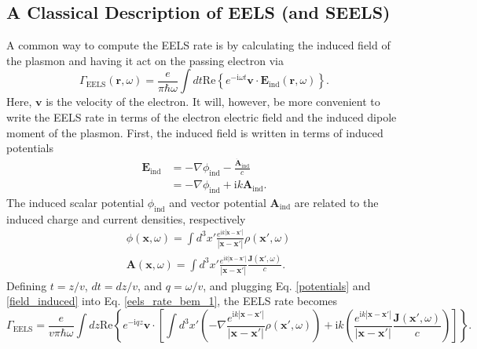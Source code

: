 \documentclass [11pt, proquest] {uwthesis}[2016/11/22]
\begin{document}
\subsection{A Classical Description of EELS (and SEELS)}

A common way to compute the EELS rate is by calculating the induced field of the plasmon and having it act on the passing electron via \cite{AbajoRevMod,Hohenester2014,Quillin}
\begin{equation}
\Gamma_{\textrm{EELS}}(\textbf{r},\omega) = \frac{e}{\pi\hbar\omega}\int dt \textrm{Re}\left\{ e^{-\textrm{i}\omega t} \textbf{v} \cdot \textbf{E}_{\textrm{ind}}(\textbf{r},\omega)\right\}.
\label{eels_rate_bem_1}
\end{equation}
Here, $\textbf{v}$ is the velocity of the electron. It will, however, be more convenient to write the EELS rate in terms of the electron electric field and the induced dipole moment of the plasmon. First, the induced field is written in terms of induced potentials
\begin{equation}
\begin{aligned}
\textbf{E}_{\textrm{ind}} &= -\nabla\phi_{\textrm{ind}} - \frac{\dot{\textbf{A}}_{\textrm{ind}}}{c}\\
&= -\nabla\phi_{\textrm{ind}} + \textrm{i}k\textbf{A}_{\textrm{ind}}.
\label{field_induced}
\end{aligned}
\end{equation}
The induced scalar potential $\phi_{\textrm{ind}}$ and vector potential $\textbf{A}_{\textrm{ind}}$ are related to the induced charge and current densities, respectively
\begin{equation}
\begin{aligned}
&\phi(\textbf{x},\omega) = \int d^3x' \frac{e^{\textrm{i}k|\textbf{x}-\textbf{x}'|}}{|\textbf{x}-\textbf{x}'|}\rho(\textbf{x}',\omega)\\
&\textbf{A}(\textbf{x},\omega) = \int d^3x' \frac{e^{\textrm{i}k|\textbf{x}-\textbf{x}'|}}{|\textbf{x}-\textbf{x}'|}\frac{\textbf{J}(\textbf{x}',\omega)}{c}.
\label{potentials}
\end{aligned}
\end{equation}
Defining $t = z/v$, $dt = dz/v$, and $q = \omega/v$, and plugging Eq. \ref{potentials} and \ref{field_induced} into Eq. \ref{eels_rate_bem_1}, the EELS rate becomes
\begin{equation}
\Gamma_{\textrm{EELS}} = \frac{e}{v\pi\hbar\omega}\int dz \textrm{Re}\left\{ e^{-\textrm{i}qz} \textbf{v} \cdot \left[\int d^3x' \left(-\nabla\frac{e^{\textrm{i}k|\textbf{x}-\textbf{x}'|}}{|\textbf{x}-\textbf{x}'|}\rho(\textbf{x}',\omega)\right) + \textrm{i}k\left(\frac{e^{\textrm{i}k|\textbf{x}-\textbf{x}'|}}{|\textbf{x}-\textbf{x}'|}\frac{\textbf{J}(\textbf{x}',\omega)}{c}\right)\right]\right\}.
\label{eels_with_potentials}
\end{equation}
\end{document}
